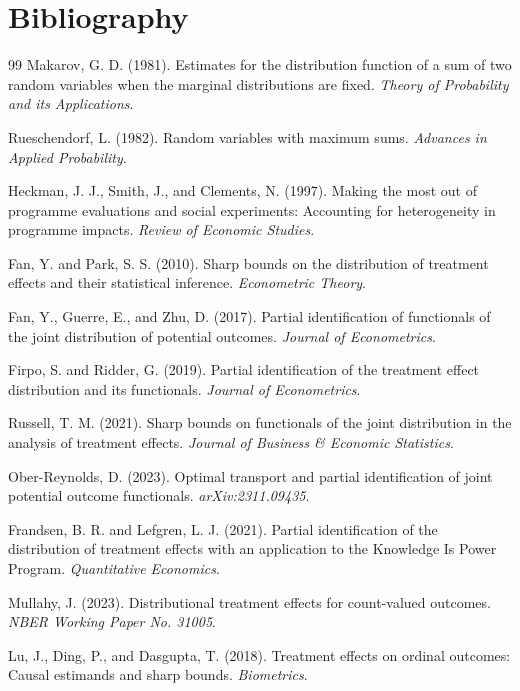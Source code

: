 \documentclass[11pt]{article}
\theoremstyle{definition}
\theoremstyle{plain}
\theoremstyle{remark}
\begin{document}
\section*{Bibliography}
\begin{thebibliography}{99}
Makarov, G. D. (1981).
Estimates for the distribution function of a sum of two random variables when the marginal distributions are fixed.
\emph{Theory of Probability and its Applications}.

Rueschendorf, L. (1982).
Random variables with maximum sums.
\emph{Advances in Applied Probability}.

Heckman, J. J., Smith, J., and Clements, N. (1997).
Making the most out of programme evaluations and social experiments: Accounting for heterogeneity in programme impacts.
\emph{Review of Economic Studies}.

Fan, Y. and Park, S. S. (2010).
Sharp bounds on the distribution of treatment effects and their statistical inference.
\emph{Econometric Theory}.

Fan, Y., Guerre, E., and Zhu, D. (2017).
Partial identification of functionals of the joint distribution of potential outcomes.
\emph{Journal of Econometrics}.

Firpo, S. and Ridder, G. (2019).
Partial identification of the treatment effect distribution and its functionals.
\emph{Journal of Econometrics}.

Russell, T. M. (2021).
Sharp bounds on functionals of the joint distribution in the analysis of treatment effects.
\emph{Journal of Business \& Economic Statistics}.

Ober-Reynolds, D. (2023).
Optimal transport and partial identification of joint potential outcome functionals.
\emph{arXiv:2311.09435}.

Frandsen, B. R. and Lefgren, L. J. (2021).
Partial identification of the distribution of treatment effects with an application to the Knowledge Is Power Program.
\emph{Quantitative Economics}.

Mullahy, J. (2023).
Distributional treatment effects for count-valued outcomes.
\emph{NBER Working Paper No. 31005}.

Lu, J., Ding, P., and Dasgupta, T. (2018).
Treatment effects on ordinal outcomes: Causal estimands and sharp bounds.
\emph{Biometrics}.
\end{thebibliography}
\end{document}
